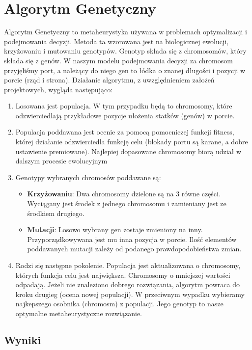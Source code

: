 \documentclass{article}
\begin{document}
\section{Algorytm Genetyczny}

Algorytm Genetyczny to metaheurystyka używana w problemach optymalizacji i podejmowania decyzji. Metoda ta wzorowana jest na biologicznej ewolucji, krzyżowaniu i mutowaniu genotypów. Genotyp składa się z chromosomów, który składa się z genów. W naszym modelu podejmowania decyzji za chromosom przyjęliśmy port, a należący do niego gen to łódka o znanej długości i pozycji w porcie (rząd i strona). Działanie algorytmu, z uwzględnieniem założeń projektowych, wygląda następująco:

\begin{enumerate}
    \item Losowana jest populacja. W tym przypadku będą to chromosomy, które odzwierciedlają przykładowe pozycje ułożenia statków (genów) w porcie.
    \item Populacja poddawana jest ocenie za pomocą pomocniczej funkcji fitness, której działanie odzwierciedla funkcję celu (blokady portu są karane, a dobre ustawienie premiowane). Najlepiej dopasowane chromosomy biorą udział w dalszym procesie ewolucyjnym
    \item Genotypy wybranych chromosów poddawane są:
    \begin{itemize}
    \item \textbf{Krzyżowaniu}: Dwa chromosomy dzielone są na 3 równe części. Wyciągany jest środek z jednego chromosomu i zamieniany jest ze środkiem drugiego. 
    \item \textbf{Mutacji}: Losowo wybrany gen zostaje zmieniony na inny. Przyporządkowywana jest mu inna pozycja w porcie. Ilość elementów poddawanych mutacji zależy od podanego prawdopodobieństwa zmian.
    \end{itemize}
    \item Rodzi się następne pokolenie. Populacja jest aktualizowana o chromosomy, których funkcja celu jest największa. Chromosomy o mniejszej wartości odpadają. Jeżeli nie znaleziono dobrego rozwiązania, algorytm powraca do kroku drugieg (ocena nowej populacji). W przeciwnym wypadku wybieramy najkepszego osobnika (chromosm) z populacji. Jego genotyp to nasze optymalne metaheurystyczne rozwiązanie. 
\end{enumerate}
    
\subsection{Wyniki}
\end{document}
